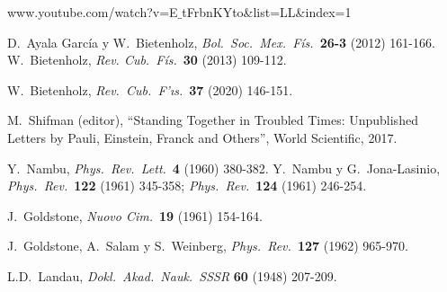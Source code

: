 \begin{thebibliography}{10}
www.youtube.com/watch?v=E$\_$tFrbnKYto\&list=LL\&index=1
  
 D.\ Ayala Garc\'ia y W.\ Bietenholz,
{\em Bol.\ Soc.\ Mex.\ F\'is.}\ {\bf 26-3} (2012) 161-166.  
W.\ Bietenholz,
{\em Rev. Cub.\ F\'is.}\ {\bf 30} (2013) 109-112.

  W.\ Bietenholz,
{\em Rev.\ Cub.\ F\a'{\i}s.}\ {\bf 37} (2020) 146-151.

 M.\ Shifman (editor), ``Standing Together in Troubled
  Times: Unpublished Letters by Pauli, Einstein, Franck and Others'',
  World Scientific, 2017.

 Y.\ Nambu,
{\em Phys.\ Rev.\ Lett.}\ {\bf 4} (1960) 380-382.
Y.\ Nambu y G.\ Jona-Lasinio,
{\em Phys.\ Rev.}\ {\bf 122} (1961) 345-358;
{\em Phys.\ Rev.}\ {\bf 124} (1961) 246-254.

 J.\ Goldstone,
{\em Nuovo Cim.}\ {\bf 19} (1961) 154-164.
  
 J.\ Goldstone, A.\ Salam y S.\ Weinberg,
  {\em Phys.\ Rev.}\ {\bf 127} (1962) 965-970.

 L.D.\ Landau, 
{\em Dokl.\ Akad.\ Nauk.\ SSSR} {\bf 60} (1948) 207-209.

\end{thebibliography}